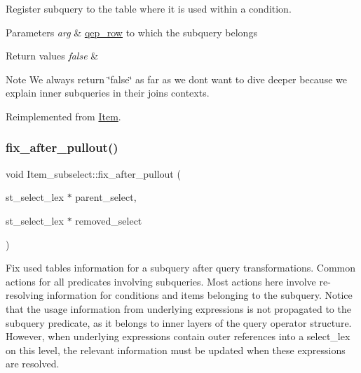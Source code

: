 Register subquery to the table where it is used within a condition.


\begin{DoxyParams}{Parameters}
{\em arg} & \mbox{\hyperlink{classqep__row}{qep\+\_\+row}} to which the subquery belongs\\
\hline
\end{DoxyParams}

\begin{DoxyRetVals}{Return values}
{\em false} & \\
\hline
\end{DoxyRetVals}
\begin{DoxyNote}{Note}
We always return \char`\"{}false\char`\"{} as far as we don\textquotesingle{}t want to dive deeper because we explain inner subqueries in their joins contexts. 
\end{DoxyNote}


Reimplemented from \mbox{\hyperlink{classItem}{Item}}.

\mbox{\label{classItem__subselect_a8636b93f943b8a52f75222eb4e49c4cf}} 
\subsubsection{\texorpdfstring{fix\+\_\+after\+\_\+pullout()}{fix\_after\_pullout()}}
{\footnotesize\ttfamily void Item\+\_\+subselect\+::fix\+\_\+after\+\_\+pullout (\begin{DoxyParamCaption}\item[{st\+\_\+select\+\_\+lex $\ast$}]{parent\+\_\+select,  }\item[{st\+\_\+select\+\_\+lex $\ast$}]{removed\+\_\+select }\end{DoxyParamCaption})\hspace{0.3cm}{\ttfamily [virtual]}}

Fix used tables information for a subquery after query transformations. Common actions for all predicates involving subqueries. Most actions here involve re-\/resolving information for conditions and items belonging to the subquery. Notice that the usage information from underlying expressions is not propagated to the subquery predicate, as it belongs to inner layers of the query operator structure. However, when underlying expressions contain outer references into a select\+\_\+lex on this level, the relevant information must be updated when these expressions are resolved. 

